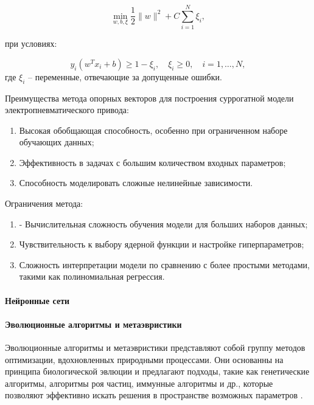 \begin{equation*}
    \min_{w, b, \xi} \frac{1}{2} \|w\|^2 + C \sum_{i=1}^N \xi_i,
\end{equation*}

при условиях:

\begin{equation*}
    y_i (w^T x_i + b) \geq 1 - \xi_i, \quad \xi_i \geq 0, \quad i = 1, \ldots, N,
\end{equation*}
где $\xi_i$ -- переменные, отвечающие за допущенные ошибки.

Преимущества метода опорных векторов для построения суррогатной модели электропневматического привода:

\begin{enumerate}
    \item Высокая обобщающая способность, особенно при ограниченном наборе обучающих данных;
    \item Эффективность в задачах с большим количеством входных параметров;
    \item Способность моделировать сложные нелинейные зависимости.
\end{enumerate}

Ограничения метода:

\begin{enumerate}
    \item - Вычислительная сложность обучения модели для больших наборов данных;
    \item Чувствительность к выбору ядерной функции и настройке гиперпараметров;
    \item Сложность интерпретации модели по сравнению с более простыми методами, такими как полиномиальная регрессия.
\end{enumerate}

\paragraph{Нейронные сети}\label{sec:ch4/sec2/subsec1/subsubsec5}

\paragraph{Эволюционные алгоритмы и метаэвристики}\label{sec:ch4/sec2/subsec1/subsubsec6}
Эволюционные алгоритмы и метаэвристики представляют собой группу методов оптимизации,
вдохновленных природными процессами.
Они основанны на принципа биологической эвлюции и предлагают подходы, такие как генетические алгоритмы,
алгоритмы роя частиц, иммунные алгоритмы и др., которые позволяют эффективно искать решения
в пространстве возможных параметров \cite{zhang2015comparision}.

